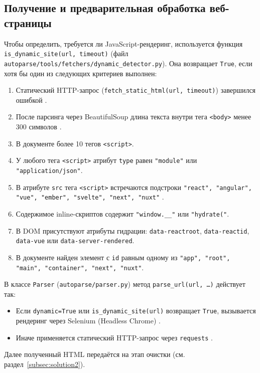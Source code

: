\subsection{Получение и предварительная обработка веб-страницы}
\label{subsec:solution1}

Чтобы определить, требуется ли JavaScript-рендеринг, используется функция \texttt{is\_dynamic\_site(url, timeout)} (файл \texttt{autoparse/tools/fetchers/dynamic\_detector.py}). Она возвращает \texttt{True}, если хотя бы один из следующих критериев выполнен:
\begin{enumerate}
    \item Статический HTTP-запрос (\texttt{fetch\_static\_html(url, timeout)}) завершился ошибкой \cite{RequestsDocumentation}.
    \item После парсинга через BeautifulSoup длина текста внутри тега \texttt{<body>} менее 300 символов \cite{Richardson2013}.
    \item В документе более 10 тегов \texttt{<script>}.
    \item У любого тега \texttt{<script>} атрибут \texttt{type} равен \texttt{"module"} или \texttt{"application/json"}.
    \item В атрибуте \texttt{src} тега \texttt{<script>} встречаются подстроки \texttt{"react", "angular", "vue", "ember", "svelte", "next", "nuxt"} \cite{W3Techs2024}.
    \item Содержимое inline-скриптов содержит \texttt{"window.\_\_"} или \texttt{"hydrate("}.
    \item В DOM присутствуют атрибуты гидрации: \texttt{data-reactroot}, \texttt{data-reactid}, \texttt{data-vue} или \texttt{data-server-rendered}.
    \item В документе найден элемент с \texttt{id} равным одному из \texttt{"app", "root", "main", "container", "next", "nuxt"}.
\end{enumerate}

В классе \texttt{Parser} (\texttt{autoparse/parser.py}) метод \texttt{parse\_url(url, \dots)} действует так:
\begin{itemize}
    \item Если \texttt{dynamic=True} или \texttt{is\_dynamic\_site(url)} возвращает \texttt{True}, вызывается рендеринг через Selenium (Headless Chrome) \cite{SeleniumDocumentation}.
    \item Иначе применяется статический HTTP-запрос через \texttt{requests} \cite{RequestsDocumentation}.
\end{itemize}
Далее полученный HTML передаётся на этап очистки (см. раздел~\ref{subsec:solution2}).

